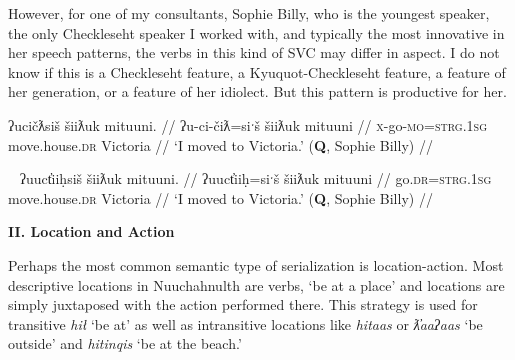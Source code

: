 However, for one of my consultants, Sophie Billy, who is the youngest speaker, the only Checkleseht speaker I worked with, and typically the most innovative in her speech patterns, the verbs in this kind of SVC may differ in aspect. I do not know if this is a Checkleseht feature, a Kyuquot-Checkleseht feature, a feature of her generation, or a feature of her idiolect. But this pattern is productive for her.

\ex \label{ex:movetovictoria1}
\begingl
\glpreamble ʔucičƛsiš šiiƛuk mituuni. //
\gla ʔu-ci-čiƛ=siˑš šiiƛuk mituuni  //
\glb \textsc{x}-go-\textsc{mo}=\textsc{strg.1sg} move.house.\textsc{dr} Victoria //
\glft `I moved to Victoria.' (\textbf{Q}, Sophie Billy) //
\endgl
\xe

\ex~ \label{ex:movetovictoria2}
\begingl
\glpreamble ʔuuct̓iiḥsiš šiiƛuk mituuni. //
\gla ʔuuct̓iiḥ=siˑš šiiƛuk mituuni  //
\glb go.\textsc{dr}=\textsc{strg.1sg} move.house.\textsc{dr} Victoria //
\glft `I moved to Victoria.' (\textbf{Q}, Sophie Billy) //
\endgl
\xe

\begin{comment}
Ordering preference. One of my speakers expressed a strong preference for the manner verb to precede the action. This mirrors how adverbs are used in Nuuchahnulth, which also tend to precede the verb. Other speakers I consulted with were comfortable with the verbs coming in either order.

\ex \label{ex:gohomedrive}
\begingl
\glpreamble ʔucičƛsiš šiiƛuk mituuni. //
\gla ʔu-ci-čiƛ=siˑš šiiƛuk mituuni  //
\glb \textsc{x}-go-\textsc{mo}=\textsc{strg.1sg} move.house-\textsc{dr} Victoria //
\glft `I moved to Victoria.' (\textbf{Q}, Sophie Billy) //
\endgl
\xe
FH
*waałšiʔaƛs ƛiiƛiiḥataḥ.
waałšiʔaƛs. ƛiiƛiiḥataḥʔaƛs.
\end{comment}

\vspace{10pt}

\noindent \textbf{II. Location and Action}

\vspace{10pt}

Perhaps the most common semantic type of serialization is location-action. Most descriptive locations in Nuuchahnulth are verbs, `be at a place' and locations are simply juxtaposed with the action performed there. This strategy is used for transitive \textit{hił} `be at' as well as intransitive locations like \textit{hitaas} or \textit{ƛ̓aaʔaas} `be outside' and \textit{hitinqis} `be at the beach.'

